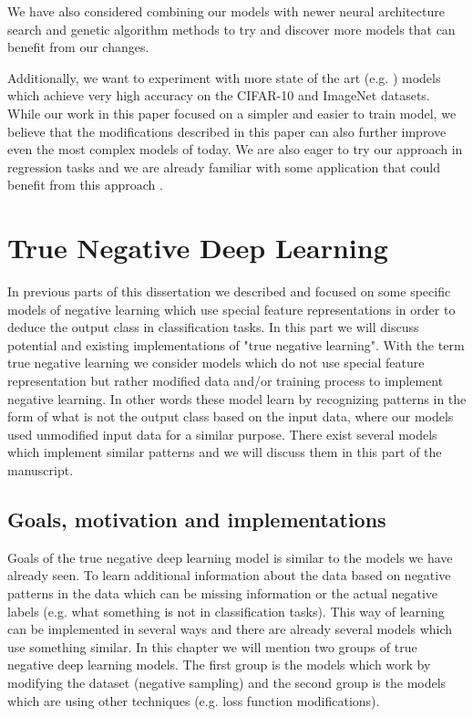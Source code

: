 \documentclass[b5paper]{book}
\let\cite\parencite
\begin{document}
We have also considered combining our models with newer neural architecture search \cite{elsken2018neural} and genetic algorithm methods \cite{assunccao2019fast} to try and discover more models that can benefit from our changes.

Additionally, we want to experiment with more state of the art (e.g. \cite{he2016deep,huang2017densely,xie2017aggregated}) models which achieve very high accuracy on the CIFAR-10 and ImageNet \cite{deng2009imagenet} datasets. While our work in this paper focused on a simpler and easier to train model, we believe that the modifications described in this paper can also further improve even the most complex models of today. We are also eager to try our approach in regression tasks and we are already familiar with some application that could benefit from this approach \cite{pecev2016system,pecev2017ltr}.

\part{True Negative Deep Learning}

In previous parts of this dissertation we described and focused on some specific models of negative learning which use special feature representations in order to deduce the output class in classification tasks. In this part we will discuss potential and existing implementations of "true negative learning". With the term true negative learning we consider models which do not use special feature representation but rather modified data and/or training process to implement negative learning. In other words these model learn by recognizing patterns in the form of what is not the output class based on the input data, where our models used unmodified input data for a similar purpose. There exist several models which implement similar patterns and we will discuss them in this part of the manuscript.

\chapter{Goals, motivation and implementations}

Goals of the true negative deep learning model is similar to the models we have already seen. To learn additional information about the data based on negative patterns in the data which can be missing information or the actual negative labels (e.g. what something is not in classification tasks). This way of learning can be implemented in several ways and there are already several models which use something similar. In this chapter we will mention two groups of true negative deep learning models. The first group is the models which work by modifying the dataset (negative sampling) and the second group is the models which are using other techniques (e.g. loss function modifications).
\end{document}
